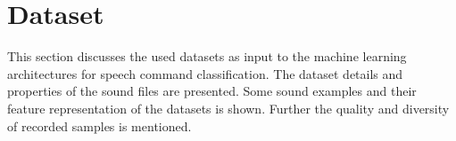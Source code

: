 
\section{Dataset}
This section discusses the used datasets as input to the machine learning architectures for speech command classification.
The dataset details and properties of the sound files are presented.
Some sound examples and their feature representation of the datasets is shown.
Further the quality and diversity of recorded samples is mentioned.